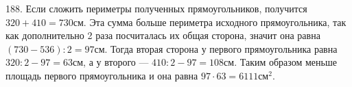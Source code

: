 188. Если сложить периметры полученных прямоугольников, получится $320+410=730$см. Эта сумма больше периметра исходного прямоугольника, так как дополнительно 2 раза посчиталась их общая сторона, значит она равна $(730-536):2=97$см. Тогда вторая сторона у первого прямоугольника равна $320:2-97=63$см, а у второго --- $410:2-97=108$см. Таким образом меньше площадь первого прямоугольника и она равна $97\cdot63=6111\text{см}^2.$\\
